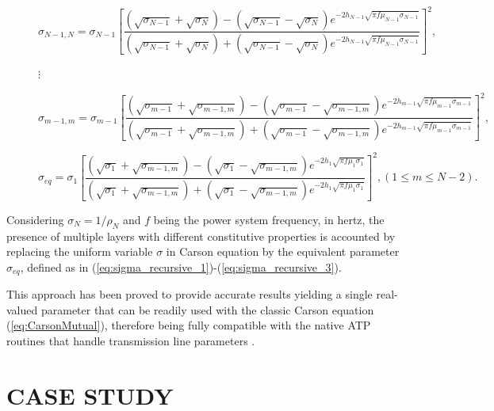 \documentclass[conference]{IEEEtran}
\begin{document}
\begin{figure}[ht]
	\begin{equation}\label{eq:sigma_recursive_1}
		\sigma_{N-1,N}=\sigma_{N-1} \left[\frac{(\sqrt{\sigma_{N-1}}+\sqrt{\sigma_N})-(\sqrt{\sigma_{N-1}}-\sqrt{\sigma_N})e^{-2h_{N-1}\sqrt{\pi f \mu_{N-1}\sigma_{N-1}}}}{(\sqrt{\sigma_{N-1}}+\sqrt{\sigma_N})+(\sqrt{\sigma_{N-1}}-\sqrt{\sigma_N})e^{-2h_{N-1}\sqrt{\pi f \mu_{N-1}\sigma_{N-1}}}}\right]^2, 
	\end{equation}
	\begin{center}
		$\vdots$
	\end{center}
	\begin{equation}\label{eq:sigma_recursive_2}
		\sigma_{m-1,m}=\sigma_{m-1} \left[\frac{(\sqrt{\sigma_{m-1}}+\sqrt{\sigma_{m-1,m}})-(\sqrt{\sigma_{m-1}}-\sqrt{\sigma_{m-1,m}})e^{-2h_{m-1}\sqrt{\pi f \mu_{m-1}\sigma_{m-1}}}}{(\sqrt{\sigma_{m-1}}+\sqrt{\sigma_{m-1,m}})+(\sqrt{\sigma_{m-1}}-\sqrt{\sigma_{m-1,m}})e^{-2h_{m-1}\sqrt{\pi f \mu_{m-1}\sigma_{m-1}}}}\right]^2,
	\end{equation}
	
	\begin{equation}\label{eq:sigma_recursive_3}
		\sigma_{eq}=\sigma_1 \left[\frac{(\sqrt{\sigma_1}+\sqrt{\sigma_{m-1,m}})-(\sqrt{\sigma_1}-\sqrt{\sigma_{m-1,m}})e^{-2h_1\sqrt{\pi f \mu_1\sigma_1}}}{(\sqrt{\sigma_1}+\sqrt{\sigma_{m-1,m}})+(\sqrt{\sigma_1}-\sqrt{\sigma_{m-1,m}})e^{-2h_1\sqrt{\pi f \mu_1\sigma_1}}}\right]^2, (1\leq m \leq N-2).
	\end{equation}
	
	\hrulefill
\end{figure} 


Considering $\sigma_{N} = 1/\rho_{N}$  and $f$ being the power system frequency, in hertz, the presence of multiple layers with different constitutive properties is accounted by replacing the uniform variable $\sigma$ in Carson equation by the equivalent parameter $\sigma_{eq}$, defined as in (\ref{eq:sigma_recursive_1})-(\ref{eq:sigma_recursive_3}).

This approach has been proved to provide accurate results yielding a single real-valued parameter that can be readily used with the classic Carson equation (\ref{eq:CarsonMutual}), therefore being fully compatible with the native ATP routines that handle transmission line parameters \cite{Martins-Britto2019}.


\section{CASE STUDY}
\end{document}
